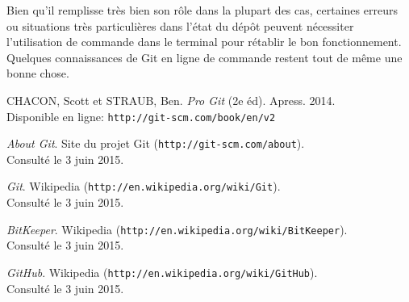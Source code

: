 \documentclass[11pt,a4paper]{article}
\begin{document}

Bien qu'il remplisse très bien son rôle dans la plupart des cas, certaines erreurs ou situations très particulières dans l'état du dépôt peuvent nécessiter l'utilisation de commande dans le terminal pour rétablir le bon fonctionnement.
Quelques connaissances de Git en ligne de commande restent tout de même une bonne chose.

\pagebreak
\begin{thebibliography}{1}

	CHACON, Scott et STRAUB, Ben. {\em Pro Git} (2e éd). Apress. 2014. \\
	Disponible en ligne: {\tt http://git-scm.com/book/en/v2}

	{\em About Git}. Site du projet Git ({\tt http://git-scm.com/about}). \\
	Consulté le 3 juin 2015.

	{\em Git}. Wikipedia ({\tt http://en.wikipedia.org/wiki/Git}). \\
	Consulté le 3 juin 2015.

	{\em BitKeeper}. Wikipedia ({\tt http://en.wikipedia.org/wiki/BitKeeper}). \\
	Consulté le 3 juin 2015.

	{\em GitHub}. Wikipedia ({\tt http://en.wikipedia.org/wiki/GitHub}). \\
	Consulté le 3 juin 2015.
	
\end{thebibliography}
\end{document}
